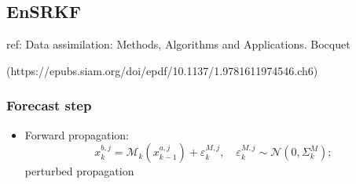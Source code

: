 \documentclass{article}
\begin{document}
\subsection{EnSRKF}
ref:
Data assimilation: Methods, Algorithms and Applications. Bocquet

(https://epubs.siam.org/doi/epdf/10.1137/1.9781611974546.ch6)

\subsubsection{Forecast step}
\begin{itemize}
	\item Forward propagation:
	      $$
		      x_k^{b,j}=\mathcal{M}_k(x_{k-1}^{a,j})+\varepsilon_k^{M,j},\quad \varepsilon_k^{M,j}\sim\mathcal{N}(0,\Sigma_k^M);
	      $$
	      perturbed propagation
\end{itemize}
\end{document}
